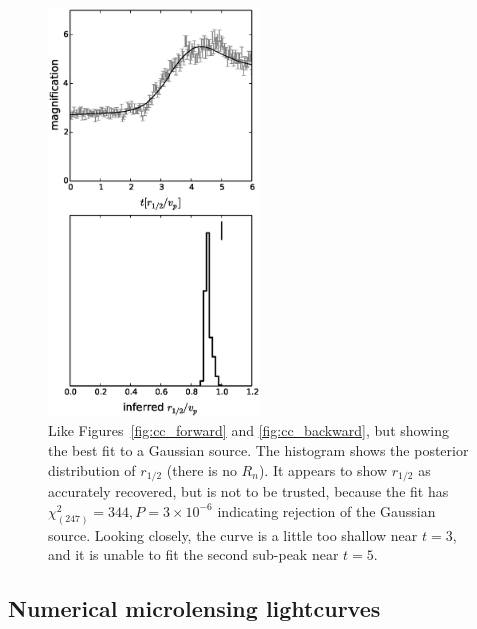 \documentclass[usenatbib]{mn2e}
\begin{document}
\begin{figure}
\centering
  \includegraphics[width=0.5\textwidth]{figures/gc_forward.eps}
\caption{\label{fig:gc_forward} Like Figures~\ref{fig:cc_forward} and
  \ref{fig:cc_backward}, but showing the best fit to a Gaussian
  source.  The histogram shows the posterior distribution of $r_{1/2}$
  (there is no $R_n$).  It appears to show $r_{1/2}$ as accurately
  recovered, but is not to be trusted, because the fit has
  $\chi^2_{(247)}=344, P=3\times10^{-6}$ indicating rejection of the
  Gaussian source.  Looking closely, the curve is a little too shallow
  near $t=3$, and it is unable to fit the second sub-peak near $t=5$.}
\end{figure}

\subsection{Numerical microlensing lightcurves}
\end{document}
